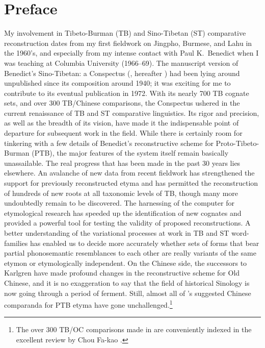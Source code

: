 \vspace{0.25em}

\renewcommand{\thefootnote}{\arabic{footnote}}
\setcounter{footnote}{0}

\chapter*{Preface}

My involvement in Tibeto-Burman (TB) and Sino-Tibetan (ST) comparative reconstruction dates from my first fieldwork on Jingpho, Burmese, and Lahu in the 1960’s, and especially from my intense contact with Paul K.\ Benedict when I was teaching at Columbia University (1966–69). The manuscript version of Benedict’s Sino-Tibetan: a Conspectus (\citealt{STC}, hereafter \textit{}) had been lying around unpublished since its composition around 1940; it was exciting for me to contribute to its eventual publication in 1972. With its nearly 700 TB cognate sets, and over 300 TB/Chinese comparisons, the Conspectus ushered in the current renaissance of TB and ST comparative linguistics. Its rigor and precision, as well as the breadth of its vision, have made it the indispensable point of departure for subsequent work in the field. While there is certainly room for tinkering with a few details of Benedict’s reconstructive scheme for Proto-Tibeto-Burman (PTB), the major features of the system itself remain basically unassailable. The real progress that has been made in the past 30 years lies elsewhere. An avalanche of new data from recent fieldwork has strengthened the support for previously reconstructed etyma and has permitted the reconstruction of hundreds of new roots at all taxonomic levels of TB, though many more undoubtedly remain to be discovered. The harnessing of the computer for etymological research has speeded up the identification of new cognates and provided a powerful tool for testing the validity of proposed reconstructions. A better understanding of the variational processes at work in TB and ST word-families has enabled us to decide more accurately whether sets of forms that bear partial phonosemantic resemblances to each other are really variants of the same etymon or etymologically independent. On the Chinese side, the successors to Karlgren have made profound changes in the reconstructive scheme for Old Chinese, and it is no exaggeration to say that the field of historical Sinology is now going through a period of ferment. Still, almost all of \textit{}’s suggested Chinese comparanda for PTB etyma have gone unchallenged.\footnote{The over 300 TB/OC comparisons made in \textit{} are conveniently indexed in the excellent review by Chou Fa-kao \citeyearpar{ACST}.}

